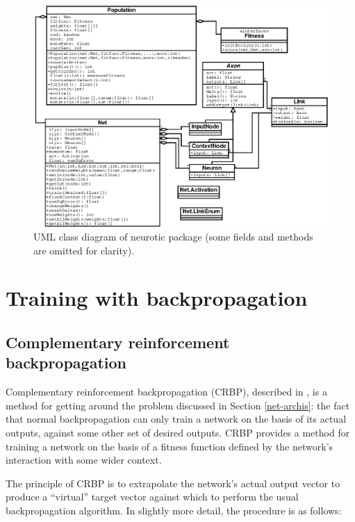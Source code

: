 \documentclass[a4paper]{report}
\newcommand{\code}[1]{{\ttfamily #1}}
\begin{document}
\begin{figure}[htb]
  \centerline{\includegraphics{figs/neurotic.eps}}
  \caption{\label{fig-neurotic} UML class diagram of \code{neurotic}
    package (some fields and methods are omitted for clarity).}
\end{figure}

\section{Training with backpropagation}

\subsection{Complementary reinforcement backpropagation}
\label{theory-crbp}

Complementary reinforcement backpropagation (CRBP), described in
\cite{ackley90}, is a method for getting around the problem discussed
in Section \ref{net-archis}: the fact that normal backpropagation can only
train a network on the basis of its actual outputs, against some other
set of desired outputs. CRBP provides a method for training a network
on the basis of a fitness function defined by the network's
interaction with some wider context.

The principle of CRBP is to extrapolate the network's actual output
vector to produce a ``virtual'' target vector against which to perform
the usual backpropagation algorithm. In slightly more detail, the
procedure is as follows:
\end{document}
